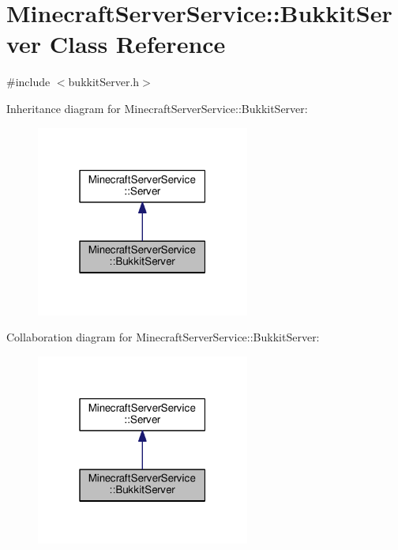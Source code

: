 \hypertarget{class_minecraft_server_service_1_1_bukkit_server}{}\section{Minecraft\+Server\+Service\+:\+:Bukkit\+Server Class Reference}
\label{class_minecraft_server_service_1_1_bukkit_server}


{\ttfamily \#include $<$bukkit\+Server.\+h$>$}



Inheritance diagram for Minecraft\+Server\+Service\+:\+:Bukkit\+Server\+:\nopagebreak
\begin{figure}[H]
\begin{center}
\leavevmode
\includegraphics[width=199pt]{class_minecraft_server_service_1_1_bukkit_server__inherit__graph}
\end{center}
\end{figure}


Collaboration diagram for Minecraft\+Server\+Service\+:\+:Bukkit\+Server\+:\nopagebreak
\begin{figure}[H]
\begin{center}
\leavevmode
\includegraphics[width=199pt]{class_minecraft_server_service_1_1_bukkit_server__coll__graph}
\end{center}
\end{figure}
